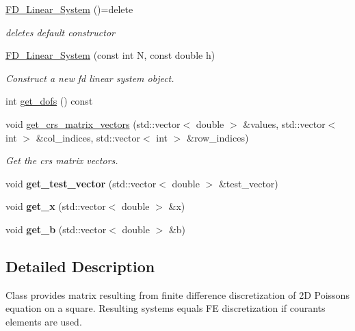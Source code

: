 \begin{DoxyCompactItemize}
\item 
\mbox{\label{classFD__Linear__System_a9552b96515055ab0f0d8c63555118c8a}} 
\mbox{\hyperlink{classFD__Linear__System_a9552b96515055ab0f0d8c63555118c8a}{F\+D\+\_\+\+Linear\+\_\+\+System}} ()=delete
\begin{DoxyCompactList}\small\item\em deletes default constructor \end{DoxyCompactList}\item 
\mbox{\hyperlink{classFD__Linear__System_a468ed4f5d475fdf24a931f8bed1b468d}{F\+D\+\_\+\+Linear\+\_\+\+System}} (const int N, const double h)
\begin{DoxyCompactList}\small\item\em Construct a new fd linear system object. \end{DoxyCompactList}\item 
int \mbox{\hyperlink{classFD__Linear__System_a751694ea10d32e771355bd849851a3e9}{get\+\_\+dofs}} () const
\item 
void \mbox{\hyperlink{classFD__Linear__System_af9e2d8789cc839532f10ad57a4392f11}{get\+\_\+crs\+\_\+matrix\+\_\+vectors}} (std\+::vector$<$ double $>$ \&values, std\+::vector$<$ int $>$ \&col\+\_\+indices, std\+::vector$<$ int $>$ \&row\+\_\+indices)
\begin{DoxyCompactList}\small\item\em Get the crs matrix vectors. \end{DoxyCompactList}\item 
\mbox{\label{classFD__Linear__System_a43f7d0d0b6b6b87b924be04e669869f3}} 
void {\bfseries get\+\_\+test\+\_\+vector} (std\+::vector$<$ double $>$ \&test\+\_\+vector)
\item 
\mbox{\label{classFD__Linear__System_a72e39786791aac2599d9272511ef534d}} 
void {\bfseries get\+\_\+x} (std\+::vector$<$ double $>$ \&x)
\item 
\mbox{\label{classFD__Linear__System_aeb47ed592abf8f11ec049db55ff64a4d}} 
void {\bfseries get\+\_\+b} (std\+::vector$<$ double $>$ \&b)
\end{DoxyCompactItemize}


\subsection{Detailed Description}
Class provides matrix resulting from finite difference discretization of 2D Poisson\textquotesingle{}s equation on a square. Resulting systems equals FE discretization if courants elements are used. 

